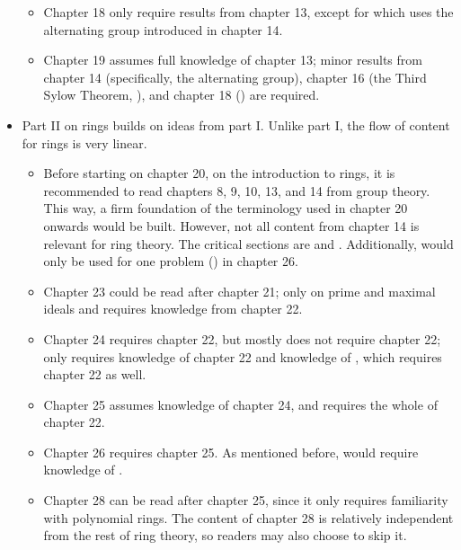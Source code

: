 \begin{itemize}
\begin{itemize}
        \item Chapter 18 only require results from chapter 13, except for  which uses the alternating group introduced in chapter 14.
        \item Chapter 19 assumes full knowledge of chapter 13; minor results from chapter 14 (specifically, the alternating group), chapter 16 (the Third Sylow Theorem, ), and chapter 18 () are required.
    \end{itemize}
    \item Part II on rings builds on ideas from part I. Unlike part I, the flow of content for rings is very linear.
    \begin{itemize}
        \item Before starting on chapter 20, on the introduction to rings, it is recommended to read chapters 8, 9, 10, 13, and 14 from group theory. This way, a firm foundation of the terminology used in chapter 20 onwards would be built. However, not all content from chapter 14 is relevant for ring theory. The critical sections are  and . Additionally,  would only be used for one problem () in chapter 26.
        \item Chapter 23 could be read after chapter 21; only  on prime and maximal ideals and  requires knowledge from chapter 22.
        \item Chapter 24 requires chapter 22, but mostly does not require chapter 22; only  requires knowledge of chapter 22 and knowledge of , which requires chapter 22 as well.
        \item Chapter 25 assumes knowledge of chapter 24, and requires the whole of chapter 22.
        \item Chapter 26 requires chapter 25. As mentioned before,  would require knowledge of .
        \item Chapter 28 can be read after chapter 25, since it only requires familiarity with polynomial rings. The content of chapter 28 is relatively independent from the rest of ring theory, so readers may also choose to skip it.

\end{itemize}
\end{itemize}
